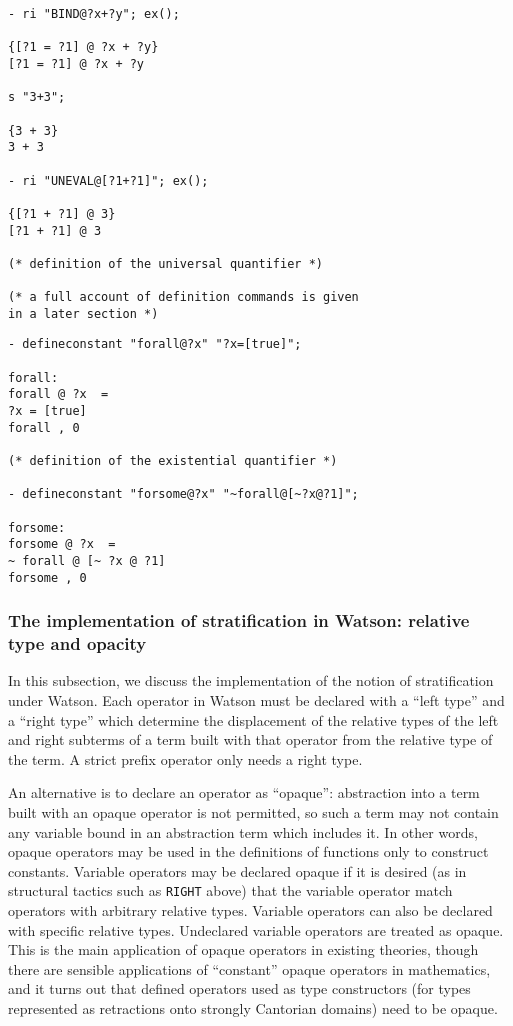 \documentclass{kluwer}
\begin{document}
\begin{article}
\begin{verbatim}
- ri "BIND@?x+?y"; ex();

{[?1 = ?1] @ ?x + ?y}
[?1 = ?1] @ ?x + ?y

s "3+3";

{3 + 3}
3 + 3

- ri "UNEVAL@[?1+?1]"; ex();

{[?1 + ?1] @ 3}
[?1 + ?1] @ 3

(* definition of the universal quantifier *)

(* a full account of definition commands is given
in a later section *)
\end{verbatim}
\newpage
\begin{verbatim}
- defineconstant "forall@?x" "?x=[true]";

forall:  
forall @ ?x  =  
?x = [true]
forall , 0

(* definition of the existential quantifier *)

- defineconstant "forsome@?x" "~forall@[~?x@?1]";

forsome:  
forsome @ ?x  =  
~ forall @ [~ ?x @ ?1]
forsome , 0

\end{verbatim}


\subsubsection{ The implementation of stratification in Watson:  relative type and opacity}

In this subsection, we discuss the implementation of the notion of
stratification under Watson.  Each operator in Watson must be declared
with a ``left type'' and a ``right type'' which determine the
displacement of the relative types of the left and right subterms of a
term built with that operator from the relative type of the term.  A
strict prefix operator only needs a right type.  

An alternative is to declare an operator as ``opaque'': abstraction
into a term built with an opaque operator is not permitted, so such a
term may not contain any variable bound in an abstraction term which
includes it.  In other words, opaque operators may be used in the
definitions of functions only to construct constants.  Variable
operators may be declared opaque if it is desired (as in structural
tactics such as {\tt RIGHT} above) that the variable operator match
operators with arbitrary relative types.  Variable operators can also
be declared with specific relative types.  Undeclared variable
operators are treated as opaque.  This is the main application of
opaque operators in existing theories, though there are sensible
applications of ``constant'' opaque operators in mathematics, and it
turns out that defined operators used as type constructors (for types
represented as retractions onto strongly Cantorian domains) need to be
opaque.


\end{article}
\end{document}

